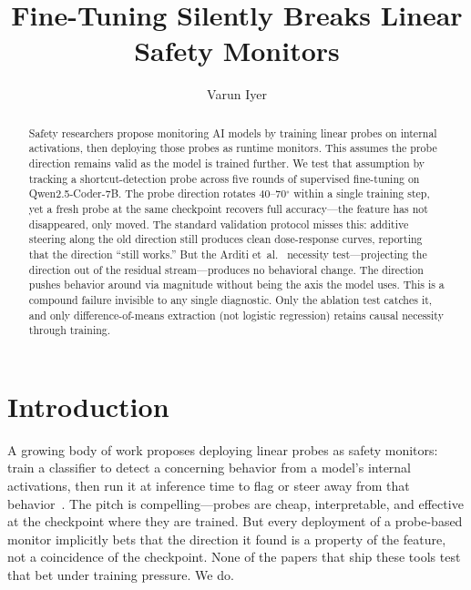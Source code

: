 \documentclass[11pt]{article}
\title{\textbf{Fine-Tuning Silently Breaks Linear Safety Monitors}}
\author{Varun Iyer}
\date{}
\begin{document}
\maketitle

\begin{abstract}
\noindent
Safety researchers propose monitoring AI models by training linear
probes on internal activations, then deploying those probes as
runtime monitors. This assumes the probe direction remains valid as
the model is trained further. We test that assumption by tracking a
shortcut-detection probe across five rounds of supervised fine-tuning
on Qwen2.5-Coder-7B. The probe direction rotates 40--70$^\circ$
within a single training step, yet a fresh probe at the same
checkpoint recovers full accuracy---the feature has not disappeared,
only moved. The standard validation protocol misses this: additive
steering along the old direction still produces clean dose-response
curves, reporting that the direction ``still works.'' But the Arditi
et~al.~\citep{arditi2024refusal} necessity test---projecting the
direction out of the residual stream---produces no behavioral
change. The direction pushes behavior around via magnitude without
being the axis the model uses. This is a compound failure invisible
to any single diagnostic. Only the ablation test catches it, and
only difference-of-means extraction (not logistic regression)
retains causal necessity through training.
\end{abstract}

\section{Introduction}
\label{sec:intro}

A growing body of work proposes deploying linear probes as safety
monitors: train a classifier to detect a concerning behavior from a
model's internal activations, then run it at inference time to flag or
steer away from that behavior~\citep{alain2016probe,zou2023representation,
turner2023activation,li2023inference,arditi2024refusal}. The pitch is
compelling---probes are cheap, interpretable, and effective at the
checkpoint where they are trained. But every deployment of a
probe-based monitor implicitly bets that the direction it found is a
property of the feature, not a coincidence of the checkpoint. None of
the papers that ship these tools test that bet under training
pressure. We do.
\end{document}
